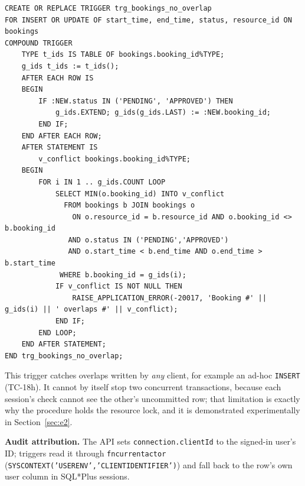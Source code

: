 \documentclass[12pt,a4paper,oneside]{report}
\renewcommand{\_}{\origus\allowbreak}
\begin{document}
\begin{lstlisting}[language=PLSQL,caption={Compound overlap trigger},label=lst:compound]
CREATE OR REPLACE TRIGGER trg_bookings_no_overlap
FOR INSERT OR UPDATE OF start_time, end_time, status, resource_id ON bookings
COMPOUND TRIGGER
    TYPE t_ids IS TABLE OF bookings.booking_id%TYPE;
    g_ids t_ids := t_ids();
    AFTER EACH ROW IS
    BEGIN
        IF :NEW.status IN ('PENDING', 'APPROVED') THEN
            g_ids.EXTEND; g_ids(g_ids.LAST) := :NEW.booking_id;
        END IF;
    END AFTER EACH ROW;
    AFTER STATEMENT IS
        v_conflict bookings.booking_id%TYPE;
    BEGIN
        FOR i IN 1 .. g_ids.COUNT LOOP
            SELECT MIN(o.booking_id) INTO v_conflict
              FROM bookings b JOIN bookings o
                ON o.resource_id = b.resource_id AND o.booking_id <> b.booking_id
               AND o.status IN ('PENDING','APPROVED')
               AND o.start_time < b.end_time AND o.end_time > b.start_time
             WHERE b.booking_id = g_ids(i);
            IF v_conflict IS NOT NULL THEN
                RAISE_APPLICATION_ERROR(-20017, 'Booking #' || g_ids(i) || ' overlaps #' || v_conflict);
            END IF;
        END LOOP;
    END AFTER STATEMENT;
END trg_bookings_no_overlap;
\end{lstlisting}

This trigger catches overlaps written by \emph{any} client, for example an ad-hoc \texttt{INSERT} (TC-18h). It cannot by itself stop two concurrent transactions, because each session's check cannot see the other's uncommitted row; that limitation is exactly why the procedure holds the resource lock, and it is demonstrated experimentally in Section~\ref{sec:e2}.

\textbf{Audit attribution.} The API sets \texttt{connection.clientId} to the signed-in user's ID; triggers read it through \texttt{fn\_current\_actor} (\texttt{SYS\_CONTEXT('USERENV','CLIENT\_IDENTIFIER')}) and fall back to the row's own user column in SQL*Plus sessions.
\end{document}
